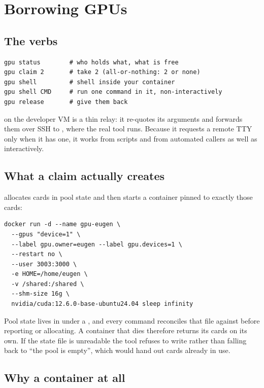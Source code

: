 \section{Borrowing GPUs}
\label{sec:borrowing}

\subsection{The verbs}

\begin{lstlisting}
gpu status        # who holds what, what is free
gpu claim 2       # take 2 (all-or-nothing: 2 or none)
gpu shell         # shell inside your container
gpu shell CMD     # run one command in it, non-interactively
gpu release       # give them back
\end{lstlisting}

 on the developer VM is a thin relay: it re-quotes its arguments and
forwards them over SSH to , where the real tool runs. Because it
requests a remote TTY only when it has one, it works from scripts and from
automated callers as well as interactively.

\subsection{What a claim actually creates}
 allocates cards in pool state and then starts a container
pinned to exactly those cards:

\begin{lstlisting}
docker run -d --name gpu-eugen \
  --gpus "device=1" \
  --label gpu.owner=eugen --label gpu.devices=1 \
  --restart no \
  --user 3003:3000 \
  -e HOME=/home/eugen \
  -v /shared:/shared \
  --shm-size 16g \
  nvidia/cuda:12.6.0-base-ubuntu24.04 sleep infinity
\end{lstlisting}

Pool state lives in  under a , and
every command reconciles that file against  before reporting or
allocating. A container that dies therefore returns its cards on its own. If
the state file is unreadable the tool refuses to write rather than falling back
to ``the pool is empty'', which would hand out cards already in use.

\subsection{Why a container at all}

